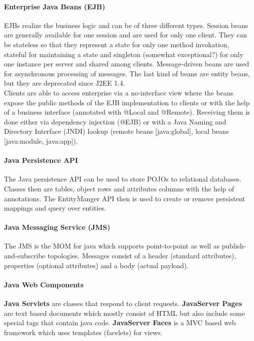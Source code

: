 \paragraph{Enterprise Java Beans (EJB)}
EJBs realize the business logic and can be of three different types.
Session beans are generally available for one session and are used for only one client.
They can be stateless so that they represent a state for only one method invokation, stateful for maintaining a state and singleton (somewhat exceptional?) for only one instance per server and shared among clients.
Message-driven beans are used for asynchronous processing of messages.
The last kind of beans are entity beans, but they are deprecated since J2EE 1.4.\\
Clients are able to access enterprise via a no-interface view where the beans expose the public methods of the EJB implementation to clients or with the help of a business interface (annotated with @Local and @Remote).
Receiving them is done either via dependency injection (@EJB) or with a Java Naming and Directory Interface (JNDI) lookup (remote beans [java:global], local beans [java:module, java:app]).

\paragraph{Java Persistence API}
The Java persistence API can be used to store POJOs to relational databases.
Classes then are tables, object rows and attributes columns with the help of annotations.
The EntityManger API then is used to create or remove persistent mappings and query over entities.

\paragraph{Java Messaging Service (JMS)}
The JMS is the MOM for java which supports point-to-point as well as publish-and-subscribe topologies.
Messages consist of a header (standard attributes), properties (optional attributes) and a body (actual payload).

\paragraph{Java Web Components}
\textbf{Java Servlets} are classes that respond to client requests.
\textbf{JavaServer Pages} are text based documents which mostly consist of HTML but also include some special tags that contain java code.
\textbf{JavaServer Faces} is a MVC based web framework which uses templates (facelets) for views.

